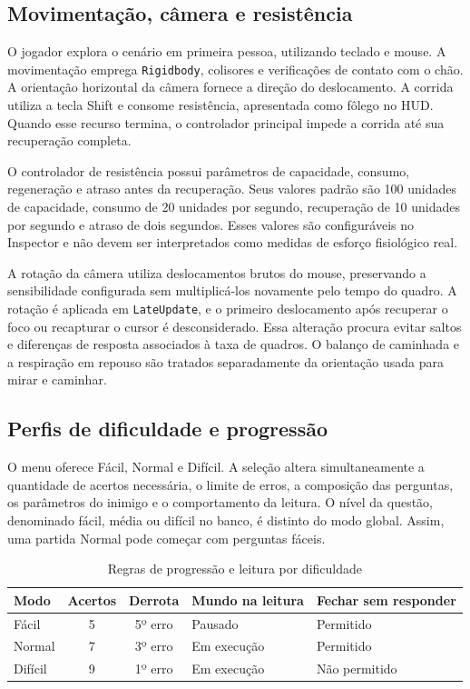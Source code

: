 \documentclass[12pt]{article}
\begin{document}
\subsection{Movimentação, câmera e resistência}

O jogador explora o cenário em primeira pessoa, utilizando teclado e mouse. A movimentação emprega \texttt{Rigidbody}, colisores e verificações de contato com o chão. A orientação horizontal da câmera fornece a direção do deslocamento. A corrida utiliza a tecla Shift e consome resistência, apresentada como fôlego no HUD. Quando esse recurso termina, o controlador principal impede a corrida até sua recuperação completa.

O controlador de resistência possui parâmetros de capacidade, consumo, regeneração e atraso antes da recuperação. Seus valores padrão são 100 unidades de capacidade, consumo de 20 unidades por segundo, recuperação de 10 unidades por segundo e atraso de dois segundos. Esses valores são configuráveis no Inspector e não devem ser interpretados como medidas de esforço fisiológico real.

A rotação da câmera utiliza deslocamentos brutos do mouse, preservando a sensibilidade configurada sem multiplicá-los novamente pelo tempo do quadro. A rotação é aplicada em \texttt{LateUpdate}, e o primeiro deslocamento após recuperar o foco ou recapturar o cursor é desconsiderado. Essa alteração procura evitar saltos e diferenças de resposta associados à taxa de quadros. O balanço de caminhada e a respiração em repouso são tratados separadamente da orientação usada para mirar e caminhar.

\subsection{Perfis de dificuldade e progressão}

O menu oferece Fácil, Normal e Difícil. A seleção altera simultaneamente a quantidade de acertos necessária, o limite de erros, a composição das perguntas, os parâmetros do inimigo e o comportamento da leitura. O nível da questão, denominado fácil, média ou difícil no banco, é distinto do modo global. Assim, uma partida Normal pode começar com perguntas fáceis.

\begin{table}[H]
\centering
\caption{Regras de progressão e leitura por dificuldade}
\label{tab:dificuldades}
\small
\begin{tabularx}{\textwidth}{l c c X X}
\toprule
\textbf{Modo} & \textbf{Acertos} & \textbf{Derrota} & \textbf{Mundo na leitura} & \textbf{Fechar sem responder} \\
\midrule
Fácil & 5 & 5º erro & Pausado & Permitido \\
Normal & 7 & 3º erro & Em execução & Permitido \\
Difícil & 9 & 1º erro & Em execução & Não permitido \\
\bottomrule
\end{tabularx}
\end{table}
\end{document}
